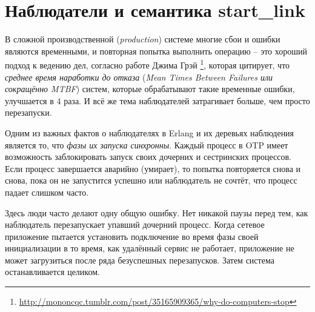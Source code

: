 \documentclass[11pt, oneside]{book}   	%
\begin{document}
\section{Наблюдатели и семантика start\_link}
\label{sec:supervisors-and-start-link-semantics}

В сложной производственной (\emph{production}) системе многие сбои и ошибки являются временными, и повторная попытка выполнить операцию -- это хороший подход к ведению дел, согласно работе Джима Грэй \footnote{\href{http://mononcqc.tumblr.com/post/35165909365/why-do-computers-stop}{http://mononcqc.tumblr.com/post/35165909365/why-do-computers-stop}}, которая цитирует, что \emph{среднее время наработки до отказа} (\emph{Mean Times Between Failures или сокращённо MTBF}) систем, которые обрабатывают такие временные ошибки, улучшается в 4 раза. И всё же тема наблюдателей затрагивает больше, чем просто перезапуски.

Одним из важных фактов о наблюдателях в Erlang и их деревьях наблюдения является то, что \emph{фазы их запуска синхронны}. Каждый процесс в OTP имеет возможность заблокировать запуск своих дочерних и сестринских процессов. Если процесс завершается аварийно (умирает), то попытка повторяется снова и снова, пока он не запустится успешно или наблюдатель не сочтёт, что процесс падает слишком часто.

Здесь люди часто делают одну общую ошибку. Нет никакой паузы перед тем, как наблюдатель перезапускает упавший дочерний процесс. Когда сетевое приложение пытается установить подключение во время фазы своей инициализации в то время, как удалённый сервис не работает, приложение не может загрузиться после ряда безуспешных перезапусков. Затем система останавливается целиком.
\end{document}
